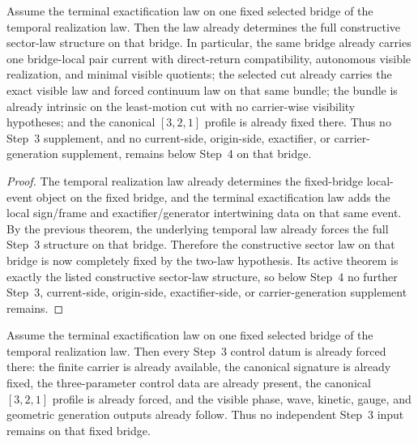 \begin{theorem}
\label{thm:temporal-plus-terminal-law-determines-the-constructive-sector-law-on-a-fixed-bridge}
Assume the terminal exactification law on one fixed selected bridge of the
temporal realization law. Then the law already determines the full
constructive sector-law structure on that bridge. In particular, the same bridge
already carries one bridge-local pair current with direct-return compatibility,
autonomous visible realization, and minimal visible quotients; the selected cut
already carries the exact visible law and forced continuum law on that same
bundle; the bundle is already intrinsic on the least-motion cut with no
carrier-wise visibility hypotheses; and the canonical \([3,2,1]\) profile is
already fixed there. Thus no Step~3 supplement, and no current-side,
origin-side, exactifier, or carrier-generation supplement, remains below
Step~4 on that bridge.
\end{theorem}

\begin{proof}
The temporal realization law already determines the fixed-bridge local-event
object on the fixed bridge, and the terminal exactification law adds the
local sign/frame and exactifier/generator intertwining data on that same
event. By the previous theorem, the underlying temporal law already forces the
full Step~3 structure on that bridge. Therefore the constructive sector law on
that bridge is now completely fixed by the two-law hypothesis. Its active theorem is
exactly the listed constructive sector-law structure, so below Step~4 no further
Step~3, current-side, origin-side, exactifier-side, or carrier-generation
supplement remains.
\end{proof}

\begin{theorem}
\label{thm:on-a-fixed-selected-bridge-only-canonical-carrier-generation-remains-genuinely-independent-in-step-3}
Assume the terminal exactification law on one fixed selected bridge of the
temporal realization law. Then every Step~3 control datum is already forced
there: the finite carrier is already available, the canonical signature is
already fixed, the three-parameter control data are already present, the
canonical \([3,2,1]\) profile is already forced, and the visible phase, wave,
kinetic, gauge, and geometric generation outputs already follow. Thus no
independent Step~3 input remains on that fixed bridge.
\end{theorem}

